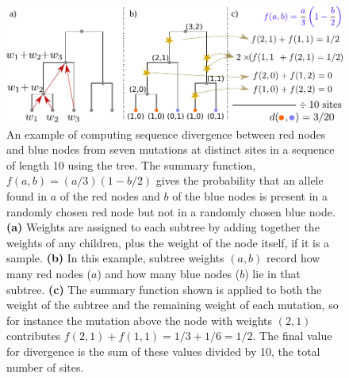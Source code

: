 \documentclass{article}
\begin{document}
\begin{figure}
    \begin{center}
    \includegraphics{figures/divergence_diagram}
    \end{center}
    \caption{
        An example of computing sequence divergence between red nodes and blue nodes
        from seven mutations at distinct sites in a sequence of length 10 using the tree.
        The summary function, $f(a,b) = (a/3)(1-b/2)$ gives the probability that
        an allele found in $a$ of the red nodes and $b$ of the blue nodes is present in
        a randomly chosen red node but not in a randomly chosen blue node.
        \textbf{(a)} Weights are assigned to each subtree by adding together the weights of any children,
        plus the weight of the node itself, if it is a sample.
        \textbf{(b)} In this example, subtree weights $(a,b)$ record how many red nodes ($a$)
        and how many blue nodes ($b$) lie in that subtree.
        \textbf{(c)} The summary function shown is applied to both the weight of the subtree
        and the remaining weight of each mutation,
        so for instance the mutation above the node with weights $(2,1)$
        contributes $f(2,1) + f(1,1) = 1/3 + 1/6 = 1/2$.
        The final value for divergence is the sum of these values divided by 10,
        the total number of sites.
        \label{fig:divergence_diagram}
    }
\end{figure}
\end{document}
